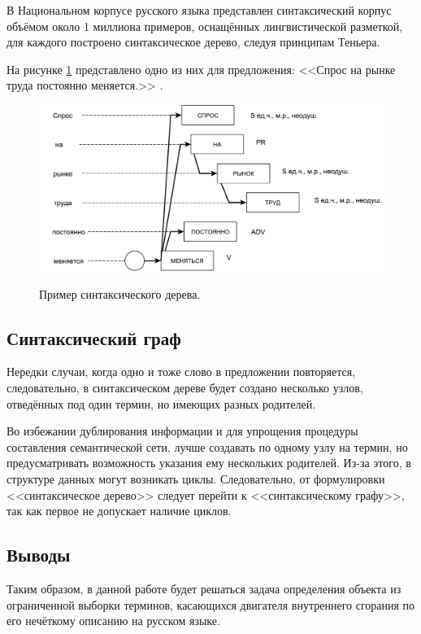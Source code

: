 В Национальном корпусе русского языка \cite{examples} представлен синтаксический корпус объёмом около 1 миллиона примеров, оснащённых лингвистической разметкой, для каждого построено синтаксическое дерево, следуя принципам Теньера.

На рисунке \ref{fig5:image} представлено одно из них для предложения: <<Спрос на рынке труда постоянно меняется.>> \cite{exampleTree}.

\begin{figure}[h]
	\begin{center}
		{\includegraphics[scale = 0.6]{img/sentence.pdf}}
		\caption{Пример синтаксического дерева.}
		\label{fig5:image}
	\end{center}
\end{figure}

\subsection{Синтаксический граф}
Нередки случаи, когда одно и тоже слово в предложении повторяется, следовательно, в синтаксическом дереве будет создано несколько узлов, отведённых под один термин, но имеющих разных родителей. 

Во избежании дублирования информации и для упрощения процедуры составления семантической сети, лучше создавать по одному узлу на термин, но предусматривать возможность указания ему нескольких родителей. Из-за этого, в структуре данных могут возникать циклы. Следовательно, от формулировки <<синтаксическое дерево>> следует перейти к <<синтаксическому графу>>, так как первое не допускает наличие циклов. \\

\subsection*{Выводы}
Таким образом, в данной работе будет решаться задача определения объекта из ограниченной выборки терминов, касающихся двигателя внутреннего сгорания по его нечёткому описанию на русском языке. 

